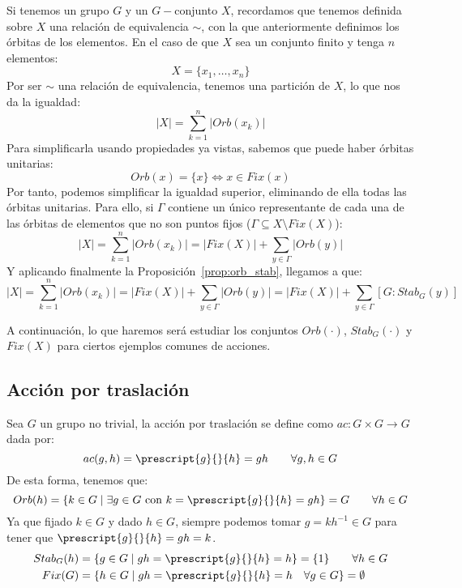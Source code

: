 \begin{observacion}
    Si tenemos un grupo $G$ y un $G-$conjunto $X$, recordamos que tenemos definida sobre $X$ una relación de equivalencia $\sim$, con la que anteriormente definimos los órbitas de los elementos. En el caso de que $X$ sea un conjunto finito y tenga $n$ elementos:
    \begin{equation*}
        X = \{x_1, \ldots, x_n\}
    \end{equation*}
    Por ser $\sim$ una relación de equivalencia, tenemos una partición de $X$, lo que nos da la igualdad:
    \begin{equation*}
        |X| = \sum_{k=1}^{n}|Orb(x_k)|
    \end{equation*}
    Para simplificarla usando propiedades ya vistas, sabemos que puede haber órbitas unitarias:
    \begin{equation*}
        Orb(x) = \{x\} \Longleftrightarrow x\in Fix(x)
    \end{equation*}
    Por tanto, podemos simplificar la igualdad superior, eliminando de ella todas las órbitas unitarias. Para ello, si $\Gamma$ contiene un único representante de cada una de las órbitas de elementos que no son puntos fijos ($\Gamma\subseteq X\setminus Fix(X)$):
    \begin{equation*}
        |X| = \sum_{k=1}^{n}|Orb(x_k)| = |Fix(X)| + \sum_{y\in \Gamma}|Orb(y)|
    \end{equation*}
    Y aplicando finalmente la Proposición~\ref{prop:orb_stab}, llegamos a que:
    \begin{equation*}
        |X| = \sum_{k=1}^{n}|Orb(x_k)| = |Fix(X)| + \sum_{y\in \Gamma}|Orb(y)| = |Fix(X)| + \sum_{y\in \Gamma} [G:Stab_G(y)]
    \end{equation*}
\end{observacion}

\noindent
A continuación, lo que haremos será estudiar los conjuntos $Orb(\cdot )$, $Stab_G(\cdot )$ y $Fix(X)$ para ciertos ejemplos comunes de acciones.
\subsection{Acción por traslación}
\noindent
Sea $G$ un grupo no trivial, la acción por traslación se define como $ac:G\times G\to G$ dada por:
\begin{equation*}
    ac(g,h) = \prescript{g}{}{h} = gh \qquad \forall g,h\in G
\end{equation*}
De esta forma, tenemos que:
\begin{equation*}
    Orb(h) = \{k\in G \mid \exists g\in G \text{\ con\ } k = \prescript{g}{}{h} = gh\} = G \qquad \forall h\in G
\end{equation*}
Ya que fijado $k\in G$ y dado $h\in G$, siempre podemos tomar $g = kh^{-1}\in G$ para tener que $\prescript{g}{}{h} = gh = k$.
\begin{align*}
    Stab_G(h) &= \{g\in G \mid gh = \prescript{g}{}{h} = h\} = \{1\} \qquad \forall h\in G\\
    Fix(G) &= \{h\in G \mid gh = \prescript{g}{}{h}=h \quad \forall g\in G\} = \emptyset 
\end{align*}

